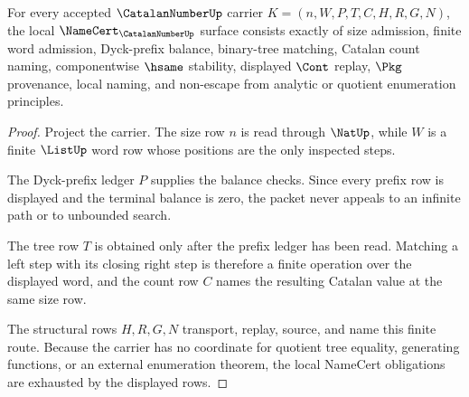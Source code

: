 \begin{theorem}
\label{thm:catalan-number-namecert-obligations}
For every accepted $\CatalanNumberUp$ carrier $K=(n,W,P,T,C,H,R,G,N)$, the local $\NameCert_{\CatalanNumberUp}$ surface consists exactly of size admission, finite word admission, Dyck-prefix balance, binary-tree matching, Catalan count naming, componentwise $\hsame$ stability, displayed $\Cont$ replay, $\Pkg$ provenance, local naming, and non-escape from analytic or quotient enumeration principles.
\end{theorem}
\begin{proof}
Project the carrier. The size row $n$ is read through $\NatUp$, while $W$ is a finite $\ListUp$ word row whose positions are the only inspected steps.

The Dyck-prefix ledger $P$ supplies the balance checks. Since every prefix row is displayed and the terminal balance is zero, the packet never appeals to an infinite path or to unbounded search.

The tree row $T$ is obtained only after the prefix ledger has been read. Matching a left step with its closing right step is therefore a finite operation over the displayed word, and the count row $C$ names the resulting Catalan value at the same size row.

The structural rows $H,R,G,N$ transport, replay, source, and name this finite route. Because the carrier has no coordinate for quotient tree equality, generating functions, or an external enumeration theorem, the local NameCert obligations are exhausted by the displayed rows.
\end{proof}


